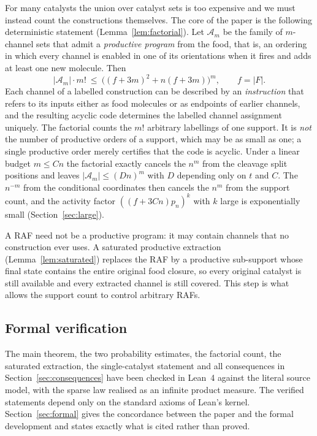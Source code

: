 \documentclass[11pt,a4paper]{article}
\theoremstyle{plain}
\theoremstyle{definition}
\theoremstyle{remark}
\newcommand{\cA}{\mathcal A}
\begin{document}
For many catalysts the union over catalyst sets is too expensive and we must instead count the constructions themselves. The core of the paper is the following deterministic statement (Lemma~\ref{lem:factorial}). Let $\cA_m$ be the family of $m$-channel sets that admit a \emph{productive program} from the food, that is, an ordering in which every channel is enabled in one of its orientations when it fires and adds at least one new molecule. Then
\begin{equation}\label{eq:factorial-intro}
|\cA_m|\cdot m!\ \le\ \bigl((f+3m)^2+n(f+3m)\bigr)^m ,\qquad f=|F|.
\end{equation}
Each channel of a labelled construction can be described by an \emph{instruction} that refers to its inputs either as food molecules or as endpoints of earlier channels, and the resulting acyclic code determines the labelled channel assignment uniquely. The factorial counts the $m!$ arbitrary labellings of one support. It is \emph{not} the number of productive orders of a support, which may be as small as one; a single productive order merely certifies that the code is acyclic. Under a linear budget $m\le Cn$ the factorial exactly cancels the $n^m$ from the cleavage split positions and leaves $|\cA_m|\le (Dn)^m$ with $D$ depending only on $t$ and $C$. The $n^{-m}$ from the conditional coordinates then cancels the $n^m$ from the support count, and the activity factor $((f+3Cn)p_n)^k$ with $k$ large is exponentially small (Section~\ref{sec:large}).

A RAF need not be a productive program: it may contain channels that no construction ever uses. A saturated productive extraction (Lemma~\ref{lem:saturated}) replaces the RAF by a productive sub-support whose final state contains the entire original food closure, so every original catalyst is still available and every extracted channel is still covered. This step is what allows the support count to control arbitrary RAFs.

\subsection{Formal verification}

The main theorem, the two probability estimates, the factorial count, the saturated extraction, the single-catalyst statement and all consequences in Section~\ref{sec:consequences} have been checked in Lean~4 \cite{demoura2021lean4,mathlib2020} against the literal source model, with the sparse law realised as an infinite product measure. The verified statements depend only on the standard axioms of Lean's kernel. Section~\ref{sec:formal} gives the concordance between the paper and the formal development and states exactly what is cited rather than proved.
\end{document}
